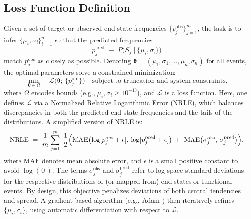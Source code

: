 \subsection{Loss Function Definition}
Given a set of target or observed end-state frequencies \(\{p_{j}^{\mathrm{obs}}\}_{j=1}^m\), the task is to infer \(\{\mu_i,\sigma_i\}_{i=1}^n\) so that the predicted frequencies 
\[
p_{j}^{\mathrm{pred}}\;\equiv\;P\bigl(S_j \mid \{\mu_i,\sigma_i\}\bigr)
\]
match \(p_{j}^{\mathrm{obs}}\) as closely as possible. Denoting \(\boldsymbol{\theta}=(\mu_1,\sigma_1,\dots,\mu_n,\sigma_n)\) for all events, the optimal parameters solve a constrained minimization:
\begin{equation}
\label{eq:ebr2_optimization}
\min_{\boldsymbol{\theta}\in\Omega}
\quad
\mathcal{L}\bigl(\boldsymbol{\theta};\,\{p_{j}^{\mathrm{obs}}\}\bigr)
\quad
\text{subject to truncation and system constraints,}
\end{equation}
where \(\Omega\) encodes bounds (e.g., \(\mu_i,\sigma_i \ge 10^{-10}\)), and \(\mathcal{L}\) is a loss function. Here, one defines \(\mathcal{L}\) via a Normalized Relative Logarithmic Error (NRLE), which balances discrepancies in both the predicted end-state frequencies and the tails of the distributions. A simplified version of NRLE is:
\begin{equation}
\label{eq:ebr2_nrle}
\text{NRLE} 
\;=\;
\frac{1}{m}
\sum_{j=1}^{m}
\;\frac{1}{2}
\Bigl(
  \text{MAE}\bigl(\log[p_{j}^{\mathrm{obs}}+\epsilon],\,\log[p_{j}^{\mathrm{pred}}+\epsilon]\bigr)
  \;+\;
  \text{MAE}\bigl(\sigma_{j}^{\mathrm{obs}},\,\sigma_{j}^{\mathrm{pred}}\bigr)
\Bigr),
\end{equation}
where \(\text{MAE}\) denotes mean absolute error, and \(\epsilon\) is a small positive constant to avoid \(\log(\,0\,)\). The terms \(\sigma_{j}^{\mathrm{obs}}\) and \(\sigma_{j}^{\mathrm{pred}}\) refer to log-space standard deviations for the respective distributions of (or mapped from) end-states or functional events. By design, this objective penalizes deviations of both central tendencies and spread. A gradient-based algorithm (e.g., Adam \citep{zhang_improved_2018}) then iteratively refines \(\{\mu_i,\sigma_i\}\), using automatic differentiation with respect to \(\mathcal{L}\).

